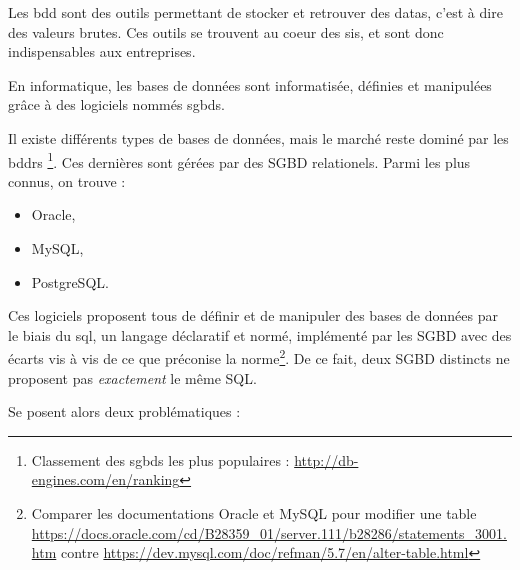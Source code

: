 Les \gls{bdd} sont des outils permettant de stocker et retrouver des \glspl{data}, c'est à dire des valeurs brutes. Ces outils se trouvent au coeur des \glspl{si}, et sont donc indispensables aux entreprises.

En informatique, les bases de données sont informatisée, définies et manipulées grâce à des logiciels nommés \glspl{sgbd}.

Il existe différents types de bases de données, mais le marché reste dominé par les \glspl{bddr} \footnote{\label{part_de_marché_relationnel}Classement des \glspl{sgbd} les plus populaires : \url{http://db-engines.com/en/ranking}}. Ces dernières sont gérées par des SGBD relationels. Parmi les plus connus, on trouve :
\begin{itemize}
\item Oracle,
\item MySQL,
\item PostgreSQL.\\
\end{itemize}

Ces logiciels proposent tous de définir et de manipuler des bases de données par le biais du \gls{sql}, un langage déclaratif et normé, implémenté par les SGBD avec des écarts vis à vis de ce que préconise la norme\footnote{\label{differences_implementation_sql_sqgbd}Comparer les documentations Oracle et MySQL pour modifier une table \url{https://docs.oracle.com/cd/B28359_01/server.111/b28286/statements_3001.htm} contre \url{https://dev.mysql.com/doc/refman/5.7/en/alter-table.html}}. De ce fait, deux SGBD distincts ne proposent pas \textit{exactement} le même SQL.

Se posent alors deux problématiques : 

